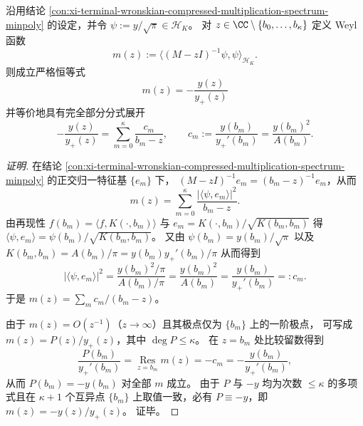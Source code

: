 \begin{conclusion}[Weyl 函数的完全闭式：\texorpdfstring{$m(z)=-y/y_{+}$}{m(z)=-y/y+}]\label{con:xi-terminal-wronskian-weyl-function-closed-form}
沿用结论 \ref{con:xi-terminal-wronskian-compressed-multiplication-spectrum-minpoly} 的设定，并令
\(
\psi:=y/\sqrt{\pi}\in\mathcal{H}_K
\)。
对 \(z\in\CC\setminus\{b_0,\dots,b_\kappa\}\) 定义 Weyl 函数
\[
m(z):=\langle (M-zI)^{-1}\psi,\psi\rangle_{\mathcal{H}_K}.
\]
则成立严格恒等式
\[
\boxed{\;m(z)=-\frac{y(z)}{y_{+}(z)}\;}
\]
并等价地具有完全部分分式展开
\[
-\frac{y(z)}{y_{+}(z)}=\sum_{m=0}^{\kappa}\frac{c_m}{b_m-z},
\qquad
c_m:=\frac{y(b_m)}{y_{+}'(b_m)}=\frac{y(b_m)^2}{A(b_m)}.
\]
\end{conclusion}
\begin{proof}[证明]
在结论 \ref{con:xi-terminal-wronskian-compressed-multiplication-spectrum-minpoly} 的正交归一特征基 \(\{e_m\}\) 下，
\((M-zI)^{-1}e_m=(b_m-z)^{-1}e_m\)，从而
\[
m(z)=\sum_{m=0}^{\kappa}\frac{|\langle \psi,e_m\rangle|^2}{b_m-z}.
\]
由再现性 \(f(b_m)=\langle f,K(\cdot,b_m)\rangle\) 与 \(e_m=K(\cdot,b_m)/\sqrt{K(b_m,b_m)}\) 得
\(
\langle \psi,e_m\rangle=\psi(b_m)/\sqrt{K(b_m,b_m)}
\)。
又由 \(\psi(b_m)=y(b_m)/\sqrt{\pi}\) 以及
\(
K(b_m,b_m)=A(b_m)/\pi=y(b_m)y_{+}'(b_m)/\pi
\)
从而得到
\[
|\langle \psi,e_m\rangle|^2
=\frac{y(b_m)^2/\pi}{A(b_m)/\pi}
=\frac{y(b_m)^2}{A(b_m)}
=\frac{y(b_m)}{y_{+}'(b_m)}
=:c_m.
\]
于是 \(m(z)=\sum_m c_m/(b_m-z)\)。

由于 \(m(z)=O(z^{-1})\)（\(z\to\infty\)）且其极点仅为 \(\{b_m\}\) 上的一阶极点，
可写成 \(m(z)=P(z)/y_{+}(z)\)，其中 \(\deg P\le \kappa\)。
在 \(z=b_m\) 处比较留数得到
\[
\frac{P(b_m)}{y_{+}'(b_m)}=\operatorname*{Res}_{z=b_m}m(z)=-c_m=-\frac{y(b_m)}{y_{+}'(b_m)},
\]
从而 \(P(b_m)=-y(b_m)\) 对全部 \(m\) 成立。
由于 \(P\) 与 \(-y\) 均为次数 \(\le\kappa\) 的多项式且在 \(\kappa+1\) 个互异点 \(\{b_m\}\) 上取值一致，必有 \(P\equiv -y\)，即 \(m(z)=-y(z)/y_{+}(z)\)。
证毕。
\end{proof}

